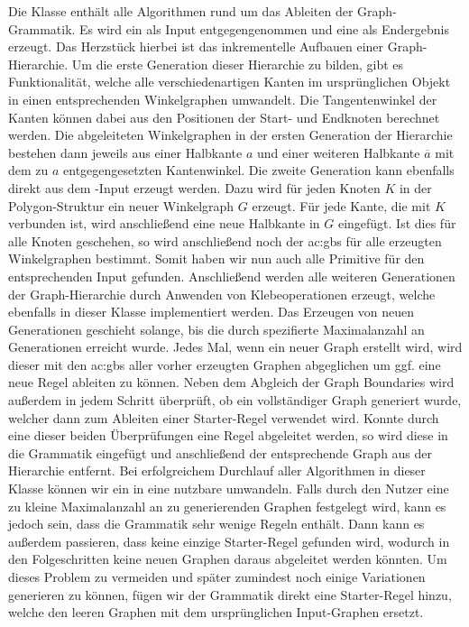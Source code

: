 Die  Klasse enthält alle Algorithmen rund um das Ableiten der Graph-Grammatik. Es wird ein  als
Input entgegengenommen und eine  als Endergebnis erzeugt. Das Herzstück hierbei ist das inkrementelle Aufbauen einer
Graph-Hierarchie. Um die erste Generation dieser Hierarchie zu bilden, gibt es Funktionalität, welche alle verschiedenartigen
Kanten im ursprünglichen  Objekt in einen entsprechenden Winkelgraphen umwandelt. Die Tangentenwinkel der Kanten
können dabei aus den Positionen der Start- und Endknoten berechnet werden. Die abgeleiteten Winkelgraphen in der ersten Generation der
Hierarchie bestehen dann jeweils aus einer Halbkante \(a\) und einer weiteren Halbkante \(\overline{a}\) mit dem zu \(a\) entgegengesetzten
Kantenwinkel. Die zweite Generation kann ebenfalls direkt aus dem -Input erzeugt werden. Dazu wird für jeden Knoten \(K\)
in der Polygon-Struktur ein neuer Winkelgraph \(G\) erzeugt. Für jede Kante, die mit \(K\) verbunden ist, wird anschließend eine neue
Halbkante in \(G\) eingefügt. Ist dies für alle Knoten geschehen, so wird anschließend noch der \gls{ac:gbs} für alle erzeugten
Winkelgraphen bestimmt. Somit haben wir nun auch alle Primitive für den entsprechenden Input gefunden. Anschließend werden alle weiteren
Generationen der Graph-Hierarchie durch Anwenden von Klebeoperationen erzeugt, welche ebenfalls in dieser Klasse implementiert werden.
Das Erzeugen von neuen Generationen geschieht solange, bis die durch  spezifierte Maximalanzahl an Generationen erreicht
wurde. Jedes Mal, wenn ein neuer Graph erstellt wird, wird dieser mit den \gls{ac:gbs} aller vorher erzeugten Graphen abgeglichen um ggf.
eine neue Regel ableiten zu können. Neben dem Abgleich der Graph Boundaries
wird außerdem in jedem Schritt überprüft, ob ein vollständiger Graph generiert wurde, welcher dann zum Ableiten einer Starter-Regel
verwendet wird. Konnte durch eine dieser beiden Überprüfungen eine Regel abgeleitet werden, so wird diese in die Grammatik eingefügt
und anschließend der entsprechende Graph aus der Hierarchie entfernt. Bei erfolgreichem Durchlauf aller Algorithmen in dieser Klasse
können wir ein  in eine nutzbare  umwandeln. Falls durch den Nutzer eine zu kleine Maximalanzahl
an zu generierenden Graphen festgelegt wird, kann es jedoch sein, dass die Grammatik sehr wenige Regeln enthält. Dann kann es außerdem
passieren, dass keine einzige Starter-Regel gefunden wird, wodurch in den Folgeschritten keine neuen Graphen daraus abgeleitet werden
könnten. Um dieses Problem zu vermeiden und später zumindest noch einige Variationen generieren zu können, fügen wir der Grammatik
direkt eine Starter-Regel hinzu, welche den leeren Graphen mit dem ursprünglichen Input-Graphen ersetzt.

